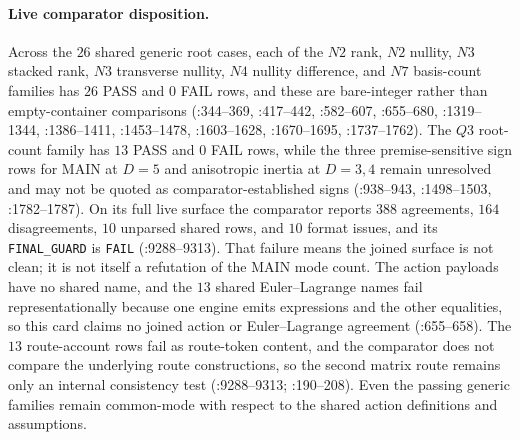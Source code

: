 \paragraph{Live comparator disposition.}
Across the \(26\) shared generic root cases, each of the \(N2\) rank, \(N2\)
nullity, \(N3\) stacked rank, \(N3\) transverse nullity, \(N4\) nullity
difference, and \(N7\) basis-count families has \(26\) PASS and \(0\) FAIL
rows, and these are bare-integer rather than empty-container comparisons
(:344--369,
:417--442, :582--607, :655--680, :1319--1344, :1386--1411,
:1453--1478, :1603--1628, :1670--1695, :1737--1762).
The \(Q3\) root-count family has \(13\) PASS and \(0\) FAIL rows, while the
three premise-sensitive sign rows for MAIN at \(D=5\) and anisotropic inertia
at \(D=3,4\) remain unresolved and may not be quoted as comparator-established
signs
(:938--943,
:1498--1503, :1782--1787).
On its full live surface the comparator reports \(388\) agreements, \(164\)
disagreements, \(10\) unparsed shared rows, and \(10\) format issues, and its
\texttt{FINAL\_GUARD} is \texttt{FAIL}
(:9288--9313).
That failure means the joined surface is not clean; it is not itself a
refutation of the MAIN mode count.
The action payloads have no shared name, and the \(13\) shared Euler--Lagrange
names fail representationally because one engine emits expressions and the
other equalities, so this card claims no joined action or Euler--Lagrange
agreement
(:655--658).
The \(13\) route-account rows fail as route-token content, and the comparator
does not compare the underlying route constructions, so the second matrix route
remains only an internal consistency test
(:9288--9313;
:190--208).
Even the passing generic families remain common-mode with respect to the shared
action definitions and assumptions.

